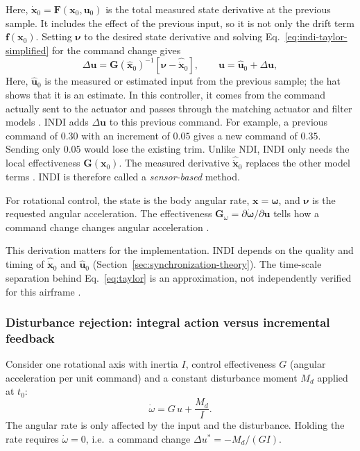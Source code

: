 \documentclass{article}
\begin{document}
Here, $\dot{\mathbf{x}}_0=\mathbf{F}(\mathbf{x}_0,\mathbf{u}_0)$ is the total measured state derivative at the previous sample. It includes the effect of the previous input, so it is not only the drift term $\mathbf{f}(\mathbf{x}_0)$. Setting $\boldsymbol{\nu}$ to the desired state derivative and solving Eq.~\eqref{eq:indi-taylor-simplified} for the command change gives
\begin{equation}
    \Delta\mathbf{u}=\mathbf{G}(\hat{\mathbf{x}}_0)^{-1}\left[\boldsymbol{\nu}-\hat{\dot{\mathbf{x}}}_0\right],\qquad
    \mathbf{u}=\hat{\mathbf{u}}_0+\Delta\mathbf{u},
    \label{eq:indi-general-law}
\end{equation}
Here, $\hat{\mathbf{u}}_0$ is the measured or estimated input from the previous sample; the hat shows that it is an estimate. In this controller, it comes from the command actually sent to the actuator and passes through the matching actuator and filter models \citep{bacon2000,steinertPart1_2025}. INDI adds $\Delta\mathbf{u}$ to this previous command. For example, a previous command of $0.30$ with an increment of $0.05$ gives a new command of $0.35$. Sending only $0.05$ would lose the existing trim. Unlike NDI, INDI only needs the local effectiveness $\mathbf{G}(\mathbf{x}_0)$. The measured derivative $\hat{\dot{\mathbf{x}}}_0$ replaces the other model terms \citep{steinertPart1_2025}. INDI is therefore called a \emph{sensor-based} method.

For rotational control, the state is the body angular rate, $\mathbf{x}=\boldsymbol{\omega}$, and $\boldsymbol{\nu}$ is the requested angular acceleration. The effectiveness $\mathbf{G}_{\omega}=\partial\dot{\boldsymbol{\omega}}/\partial\mathbf{u}$ tells how a command change changes angular acceleration \citep{steinertPart1_2025,lombaerts2019}.

This derivation matters for the implementation. INDI depends on the quality and timing of $\hat{\dot{\mathbf{x}}}_0$ and $\hat{\mathbf{u}}_0$ (Section~\ref{sec:synchronization-theory}). The time-scale separation behind Eq.~\eqref{eq:taylor} is an approximation, not independently verified for this airframe \citep{lombaerts2019,steinertPart1_2025}.

\subsubsection{Disturbance rejection: integral action versus incremental feedback}
\label{sec:pid-vs-indi-disturbance}
Consider one rotational axis with inertia $I$, control effectiveness $G$ (angular acceleration per unit command) and a constant disturbance moment $M_d$ applied at $t_0$:
\begin{equation}
    \dot\omega = G\,u + \frac{M_d}{I}.
    \label{eq:axis-disturbance}
\end{equation}
The angular rate is only affected by the input and the disturbance. Holding the rate requires $\dot\omega=0$, i.e.\ a command change $\Delta u^\ast=-M_d/(G I)$.
\end{document}
